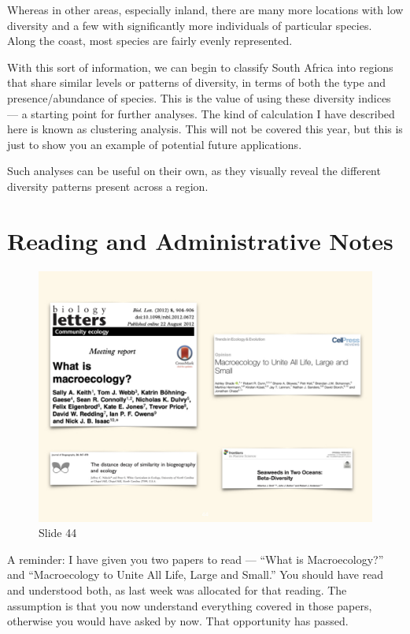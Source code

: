 \documentclass[
  10pt,
]{book}
\begin{document}
Whereas in other areas, especially inland, there are many more locations
with low diversity and a few with significantly more individuals of
particular species. Along the coast, most species are fairly evenly
represented.

With this sort of information, we can begin to classify South Africa
into regions that share similar levels or patterns of diversity, in
terms of both the type and presence/abundance of species. This is the
value of using these diversity indices --- a starting point for further
analyses. The kind of calculation I have described here is known as
clustering analysis. This will not be covered this year, but this is
just to show you an example of potential future applications.

Such analyses can be useful on their own, as they visually reveal the
different diversity patterns present across a region.

\section{Reading and Administrative
Notes}\label{reading-and-administrative-notes}

\begin{figure}[ht]
\centering
\includegraphics[width=0.8\linewidth]{../images/BDC334/BDC334-044.jpeg}
\caption*{Slide 44}
\end{figure}

A reminder: I have given you two papers to read --- ``What is
Macroecology?'' and ``Macroecology to Unite All Life, Large and Small.''
You should have read and understood both, as last week was allocated for
that reading. The assumption is that you now understand everything
covered in those papers, otherwise you would have asked by now. That
opportunity has passed.
\end{document}

